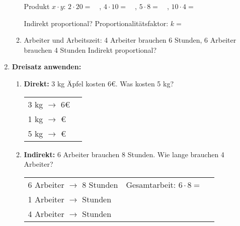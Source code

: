 \begin{enumerate}[label=\arabic*.]
\begin{enumerate}[label=\alph*)]
        Produkt $x \cdot y$: $2 \cdot 20 = \phantom{00}$, $4 \cdot 10 = \phantom{00}$, $5 \cdot 8 = \phantom{00}$, $10 \cdot 4 = \phantom{00}$

        Indirekt proportional? \underline{\hspace{2cm}} Proportionalitätsfaktor: $k = \phantom{00}$
        \vspace{0.5cm}

        \item Arbeiter und Arbeitszeit: 4 Arbeiter brauchen 6 Stunden, 6 Arbeiter brauchen 4 Stunden
        Indirekt proportional? \underline{\hspace{2cm}}
    \end{enumerate}

    \vspace{1cm}

    \item \textbf{Dreisatz anwenden:}
    \vspace{0.5cm}

    \begin{enumerate}[label=\alph*)]
        \item \textbf{Direkt:} 3 kg Äpfel kosten 6€. Was kosten 5 kg?
        \begin{tabular}{ll}
            3 kg $\rightarrow$ 6€ & \\
            1 kg $\rightarrow$ \underline{\hspace{1cm}}€ & \\
            5 kg $\rightarrow$ \underline{\hspace{1cm}}€ &
        \end{tabular}
        \vspace{0.5cm}

        \item \textbf{Indirekt:} 6 Arbeiter brauchen 8 Stunden. Wie lange brauchen 4 Arbeiter?
        \begin{tabular}{ll}
            6 Arbeiter $\rightarrow$ 8 Stunden & Gesamtarbeit: $6 \cdot 8 = \phantom{00}$ \\
            1 Arbeiter $\rightarrow$ \underline{\hspace{1cm}} Stunden & \\
            4 Arbeiter $\rightarrow$ \underline{\hspace{1cm}} Stunden &
        \end{tabular}
    \end{enumerate}

\end{enumerate}